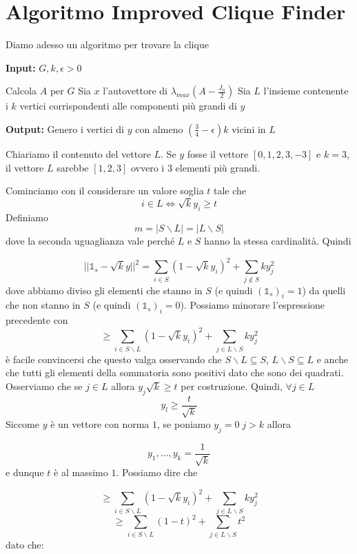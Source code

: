 \documentclass[12pt]{report}
\begin{document}
\section{Algoritmo Improved Clique Finder}

Diamo adesso un algoritmo per trovare la clique

\begin{algorithm}
\caption{}\label{euclid}
\textbf{Input:} $G,k,\epsilon > 0$
\begin{algorithmic}[1]
\State Calcola $A$ per $G$
\State Sia $x$ l'autovettore di $\lambda_{max}(A - \frac{J_n}{2})$
\State Sia $L$ l'insieme contenente i $k$ vertici corrispondenti alle componenti più grandi di $y$
\end{algorithmic}
\textbf{Output:} Genero i vertici di $y$ con almeno $(\frac{3}{4}-\epsilon)k$ vicini in $L$
\end{algorithm}
\noindent
Chiariamo il contenuto del vettore $L$. Se $y$ fosse il vettore $[0,1,2,3,-3]$ e $k = 3$, il vettore $L$ sarebbe $[1,2,3]$ ovvero i $3$ elementi più grandi.

Cominciamo con il considerare un valore soglia $t$ tale che 
$$i \in L \Leftrightarrow \sqrt{k}y_i \geq t$$
Definiamo 
$$m = |S \backslash L | = |L \backslash S|$$
dove la seconda uguaglianza vale perché $L$ e $S$ hanno la stessa cardinalità. Quindi

$$||\mathds{1}_s - \sqrt{k}y||^2 = \sum_{i \in S} (1 - \sqrt{k} y_i)^2 + \sum_{j \notin S} ky_j^2$$
dove abbiamo diviso gli elementi che stanno in $S$ (e quindi $(\mathds{1}_s)_i = 1$) da quelli che non stanno in $S$ (e quindi $(\mathds{1}_s)_i = 0$). Possiamo minorare l'espressione precedente con
$$\geq \sum_{i \in S\backslash L} (1-\sqrt{k} y_i)^2 + \sum_{j \in L \backslash S} ky_j^2$$
è facile convincersi che questo valga osservando che $S \backslash L \subseteq S$, $L\backslash S \subseteq L$ e anche che tutti gli elementi della sommatoria sono positivi dato che sono dei quadrati. Osserviamo che se $j \in L$ allora $y_j \sqrt{k} \geq t$ per costruzione. Quindi, $\forall j \in L$
    $$y_l \geq \frac{t}{\sqrt{k}}$$
Siccome $y$ è un vettore con norma $1$, se poniamo $y_j = 0\; j > k$ allora

$$y_1,\dots,y_k = \frac{1}{\sqrt{k}}$$
e dunque $t$ è al massimo $1$. Possiamo dire che 

$$\geq \sum_{i \in S\backslash L} (1-\sqrt{k} y_i)^2 + \sum_{j \in L \backslash S} ky_j^2$$
$$\geq \sum_{i \in S\backslash L} (1-t)^2 + \sum_{j \in L \backslash S} t^2$$
dato che:
\end{document}

